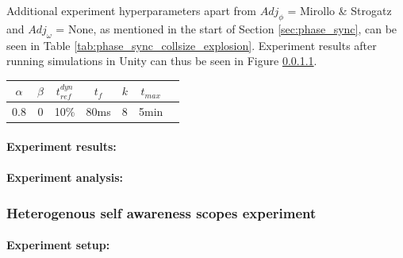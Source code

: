 			Additional experiment hyperparameters apart from $Adj_\phi$ = Mirollo \& Strogatz and $Adj_\omega$ = None, as mentioned in the start of Section \ref{sec:phase_sync}, can be seen in Table \ref{tab:phase_sync_collsize_explosion}. Experiment results after running simulations in Unity can thus be seen in Figure \ref{}.
			
			\begin{center}
			\begin{tabular}{ |c|c|c|c|c|c|c| } 
			\hline
			$\alpha$ & $\beta$ & $t_{ref}^{dyn}$ & $t_f$ & $k$ & $t_{max}$ \\
			\hline
			0.8 & 0 & 10\% & 80ms & 8 & 5min \\
			\hline
			\end{tabular}
			\label{tab:phase_sync_collsize_explosion}
			\end{center}
			
			\paragraph{Experiment results:\nl}
			
			
			\paragraph{Experiment analysis:\nl}
	
	
		\subsubsection{Heterogenous self awareness scopes experiment}
		
			\paragraph{Experiment setup:\nl}
			

